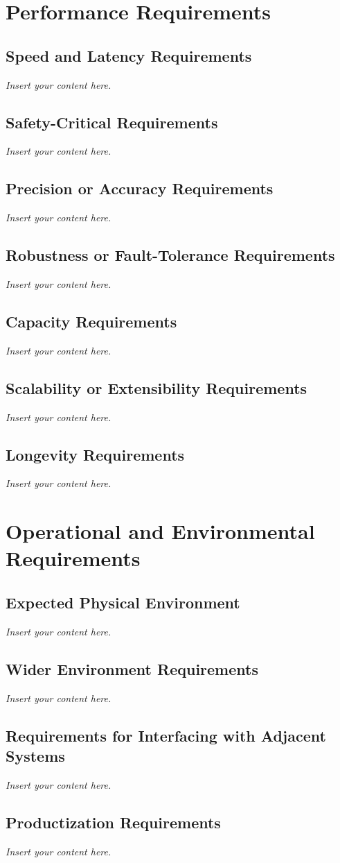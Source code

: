 \documentclass[12pt]{article}
\newcommand{\lips}{\textit{Insert your content here.}}
\begin{document}
\section{Performance Requirements}
\subsection{Speed and Latency Requirements}
\lips
\subsection{Safety-Critical Requirements}
\lips
\subsection{Precision or Accuracy Requirements}
\lips
\subsection{Robustness or Fault-Tolerance Requirements}
\lips
\subsection{Capacity Requirements}
\lips
\subsection{Scalability or Extensibility Requirements}
\lips
\subsection{Longevity Requirements}
\lips

\section{Operational and Environmental Requirements}
\subsection{Expected Physical Environment}
\lips
\subsection{Wider Environment Requirements}
\lips
\subsection{Requirements for Interfacing with Adjacent Systems}
\lips
\subsection{Productization Requirements}
\lips
\end{document}
